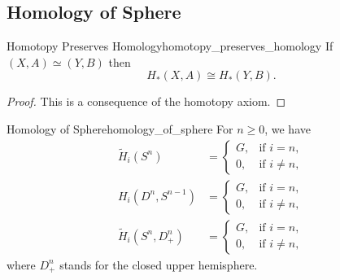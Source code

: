\documentclass{article}
\begin{document}
\subsection{Homology of Sphere}

\begin{theorem}{Homotopy Preserves Homology}{homotopy_preserves_homology}
    If $(X,A) \simeq (Y,B)$ then
    \[ H_*(X,A) \cong H_*(Y,B). \]
\end{theorem}
\begin{proof}
    This is a consequence of the homotopy axiom.
\end{proof}

\begin{theorem}{Homology of Sphere}{homology_of_sphere}
    For $n\ge 0$, we have
    \begin{align*}
        \tilde{H}_i(S^n) &= \begin{cases}
            G, & \text{if } i = n,\\
            0, & \text{if } i \neq n,
        \end{cases} \\
        {H}_i(D^n, S^{n-1}) &= \begin{cases}
            G, & \text{if } i = n,\\
            0, & \text{if } i \neq n,
        \end{cases} \\
        \tilde{H}_i(S^n,D^n_+) &= \begin{cases}
            G, & \text{if } i = n,\\
            0, & \text{if } i \neq n,
        \end{cases}
    \end{align*}
    where $D^n_+$ stands for the closed upper hemisphere.
\end{theorem}
\end{document}
